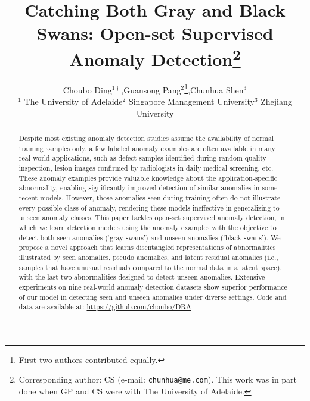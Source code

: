 \documentclass[10pt,twocolumn,letterpaper]{article}
\begin{document}
  
\title{Catching Both Gray and Black Swans: Open-set Supervised Anomaly Detection\thanks{Corresponding author: CS (e-mail: {\tt  chunhua@me.com}). This work was in part
done when GP and CS were with The University of Adelaide.}
}

\author{Choubo Ding$^{1\dagger}$,\qquad Guansong Pang$^2$\thanks{First two authors contributed equally.},\qquad Chunhua Shen$^3$\\[0.12cm]
        $^1$ The University of Adelaide\quad $^2$ Singapore Management University\quad $^3$ Zhejiang University}

\maketitle


\begin{abstract}
Despite most 
existing anomaly detection studies assume the availability of normal training samples only, a few labeled anomaly examples are often available in many real-world applications, such as defect samples identified during random quality inspection, lesion images confirmed by radiologists in daily medical screening, etc. These anomaly examples provide valuable knowledge about the application-specific abnormality, enabling significantly improved detection of similar anomalies in some recent models. However, those anomalies seen during training often do not illustrate every possible class of anomaly, rendering these models ineffective in generalizing to unseen anomaly classes.
This paper tackles open-set supervised anomaly detection, in which we learn detection models using the anomaly examples with the objective to detect both seen anomalies (`gray swans') and unseen anomalies (`black swans'). We propose a novel approach that learns disentangled representations of abnormalities illustrated by seen anomalies, pseudo anomalies, and latent residual anomalies (i.e., samples that have unusual residuals compared to the normal data in a latent space), with the last two abnormalities designed to detect unseen anomalies. Extensive experiments on nine real-world anomaly detection datasets show superior performance of our model in detecting seen and unseen anomalies
under diverse settings. Code and data are available at: \renewcommand\UrlFont{\color{blue}\tt}
\url{https://github.com/choubo/DRA}

\end{abstract}
\end{document}

